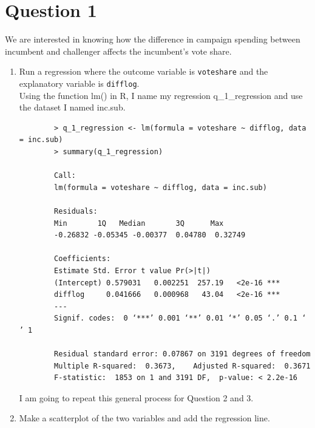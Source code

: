 \documentclass[12pt,letterpaper]{article}
\begin{document}
\section*{Question 1}
\vspace{.25cm}
\noindent We are interested in knowing how the difference in campaign spending between incumbent and challenger affects the incumbent's vote share. 
	\begin{enumerate}
		\item 
		Run a regression where the outcome variable is \texttt{voteshare} and the explanatory variable is \texttt{difflog}.\\ 
		
		\noindent Using the function lm() in R, I name my regression 	q\_1\_regression and use the dataset I named inc.sub.
		\begin{verbatim}
		> q_1_regression <- lm(formula = voteshare ~ difflog, data = inc.sub)
		> summary(q_1_regression)
		
		Call:
		lm(formula = voteshare ~ difflog, data = inc.sub)
		
		Residuals:
		Min       1Q   Median       3Q      Max 
		-0.26832 -0.05345 -0.00377  0.04780  0.32749 
		
		Coefficients:
		Estimate Std. Error t value Pr(>|t|)    
		(Intercept) 0.579031   0.002251  257.19   <2e-16 ***
		difflog     0.041666   0.000968   43.04   <2e-16 ***
		---
		Signif. codes:  0 ‘***’ 0.001 ‘**’ 0.01 ‘*’ 0.05 ‘.’ 0.1 ‘ ’ 1
		
		Residual standard error: 0.07867 on 3191 degrees of freedom
		Multiple R-squared:  0.3673,	Adjusted R-squared:  0.3671 
		F-statistic:  1853 on 1 and 3191 DF,  p-value: < 2.2e-16
	\end{verbatim}
	I am going to repeat this general process for Question 2 and 3.
		\item Make a scatterplot of the two variables and add the regression line. 	\\
		

\end{enumerate}
\end{document}
